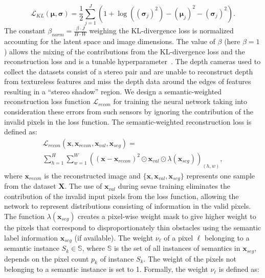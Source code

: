 \small
\begin{equation}
    \mathcal{L}_{KL}(\bm{\mu}, \bm{\sigma}) = \frac{1}{2}\sum_{j=1}^J \left (1 + \log((\bm{\sigma}_j)^2) - (\bm{\mu}_j)^2 - (\bm{\sigma}_j)^2 \right).
\end{equation}
\normalsize
The constant $\beta_{norm} = \frac{\beta\cdot J}{H\cdot W}$ weighing the KL-divergence loss is normalized accounting for the latent space and image dimensions. The value of $\beta$ (here $\beta = 1$) allows the mixing of the contributions from the KL-divergence loss and the reconstruction loss and is a tunable hyperparameter~\cite{higgins2017betavae}. The depth cameras used to collect the datasets consist of a stereo pair and are unable to reconstruct depth from textureless features and miss the depth data around the edges of features resulting in a ``stereo shadow'' region. We design a semantic-weighted reconstruction loss function $\mathcal{L}_{recon}$ for training the neural network taking into consideration these errors from such sensors by ignoring the contribution of the invalid pixels in the loss function. The semantic-weighted reconstruction loss is defined as:
\vspace{-1ex}
\begin{multline}\label{eq:reconstruction_loss}
    \mathcal{L}_{recon}(\mathbf{x}, \mathbf{x}_{recon}, \mathbf{x}_{val}, \mathbf{x}_{seg}) =\\ \sum_{h=1}^{H}\sum_{w=1}^{W}((\mathbf{x}-\mathbf{x}_{recon})^2\odot{\mathbf{x}_{val}}\odot{\lambda(\mathbf{x}_{seg})})_{(h,w)},
\end{multline}
where $\mathbf{x}_{recon}$ is the reconstructed image and $\{\mathbf{x}, \mathbf{x}_{val}, \mathbf{x}_{seg}\}$ represents one sample from the dataset $\mathbf{X}$. The use of $\mathbf{x}_{val}$ during \ac{sevae} training eliminates the contribution of the invalid input pixels from the loss function, allowing the network to represent distributions consisting of information in the valid pixels. The function $\lambda(\mathbf{x}_{seg})$ creates a pixel-wise weight mask to give higher weight to the pixels that correspond to disproportionately thin obstacles using the semantic label information $\mathbf{x}_{seg}$ (if available). The weight $\nu_\ell$ of a pixel $\ell$ belonging to a semantic instance $S_k \in \mathbb{S}$, where $\mathbb{S}$ is the set of all instances of semantics in $\mathbf{x}_{seg}$, depends on the pixel count $p_k$ of instance $S_k$. The weight of the pixels not belonging to a semantic instance is set to 1. Formally, the weight $\nu_\ell$ is defined as:

